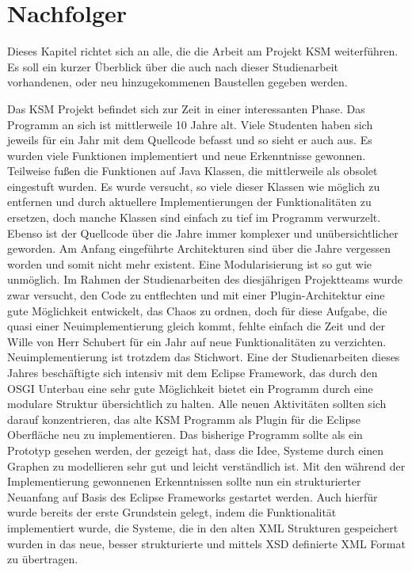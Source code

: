 \section{Nachfolger}

Dieses Kapitel richtet sich an alle, die die Arbeit am Projekt KSM weiterführen. Es soll ein kurzer Überblick über die auch nach dieser Studienarbeit vorhandenen, oder neu hinzugekommenen Baustellen gegeben werden. 

Das KSM Projekt befindet sich zur Zeit in einer interessanten Phase. Das Programm an sich ist mittlerweile 10 Jahre alt. Viele Studenten haben sich jeweils für ein Jahr mit dem Quellcode befasst und so sieht er auch aus. Es wurden viele Funktionen implementiert und neue Erkenntnisse gewonnen. Teilweise fußen die Funktionen auf Java Klassen, die mittlerweile als obsolet eingestuft wurden. Es wurde versucht, so viele dieser Klassen wie möglich zu entfernen und durch aktuellere Implementierungen der Funktionalitäten zu ersetzen, doch manche Klassen sind einfach zu tief im Programm verwurzelt. Ebenso ist der Quellcode über die Jahre immer komplexer und unübersichtlicher geworden. Am Anfang eingeführte Architekturen sind über die Jahre vergessen worden und somit nicht mehr existent. Eine Modularisierung ist so gut wie unmöglich. Im Rahmen der Studienarbeiten des diesjährigen Projektteams wurde zwar versucht, den Code zu entflechten und mit einer Plugin-Architektur eine gute Möglichkeit entwickelt, das Chaos zu ordnen, doch für diese Aufgabe, die quasi einer Neuimplementierung gleich kommt, fehlte einfach die Zeit und der Wille von Herr Schubert für ein Jahr auf neue Funktionalitäten zu verzichten. Neuimplementierung ist trotzdem das Stichwort. Eine der Studienarbeiten dieses Jahres beschäftigte sich intensiv mit dem Eclipse Framework, das durch den OSGI Unterbau eine sehr gute Möglichkeit bietet ein Programm durch eine modulare Struktur übersichtlich zu halten. Alle neuen Aktivitäten sollten sich darauf konzentrieren, das alte KSM Programm als Plugin für die Eclipse Oberfläche neu zu implementieren. Das bisherige Programm sollte als ein Prototyp gesehen werden, der gezeigt hat, dass die Idee, Systeme durch einen Graphen zu modellieren sehr gut und leicht verständlich ist. Mit den während der Implementierung gewonnenen Erkenntnissen sollte nun ein strukturierter Neuanfang auf Basis des Eclipse Frameworks gestartet werden. Auch hierfür wurde bereits der erste Grundstein gelegt, indem die Funktionalität implementiert wurde, die Systeme, die in den alten XML Strukturen gespeichert wurden in das neue, besser strukturierte und mittels XSD definierte XML Format zu übertragen.

